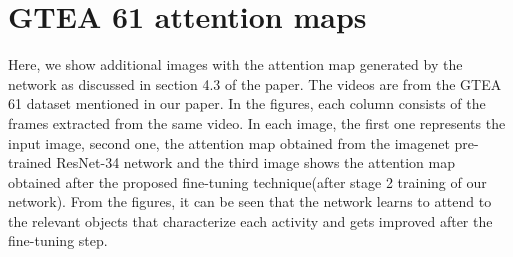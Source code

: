 \documentclass{bmvc2k}
\begin{document}
\section{GTEA 61 attention maps}
\label{sec:2}
Here, we show additional images with the attention map generated by the network as discussed in section 4.3 of the paper. The videos are from the GTEA 61 dataset mentioned in our paper. In the figures, each column consists of the frames extracted from the same video. In each image, the first one represents the input image, second one, the attention map obtained from the imagenet pre-trained ResNet-34 network and the third image shows the attention map obtained after the proposed fine-tuning technique(after stage 2 training of our network). From the figures, it can be seen that the network learns to attend to the relevant objects that characterize each activity and gets improved after the fine-tuning step. 
\end{document}

